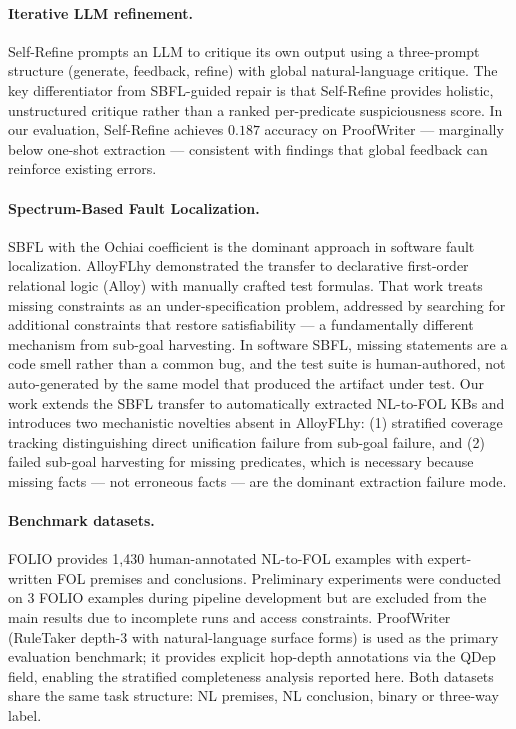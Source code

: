 \documentclass[11pt,letterpaper]{article}
\begin{document}
\paragraph{Iterative LLM refinement.} Self-Refine \citep{Madaan2023} prompts an LLM to critique its own output using a three-prompt structure (generate, feedback, refine) with global natural-language critique. The key differentiator from SBFL-guided repair is that Self-Refine provides holistic, unstructured critique rather than a ranked per-predicate suspiciousness score. In our evaluation, Self-Refine achieves $0.187$ accuracy on ProofWriter — marginally below one-shot extraction — consistent with findings that global feedback can reinforce existing errors.

\paragraph{Spectrum-Based Fault Localization.} SBFL with the Ochiai coefficient \citep{Abreu2007} is the dominant approach in software fault localization. AlloyFLhy \citep{Wang2020} demonstrated the transfer to declarative first-order relational logic (Alloy) with manually crafted test formulas. That work treats missing constraints as an under-specification problem, addressed by searching for additional constraints that restore satisfiability — a fundamentally different mechanism from sub-goal harvesting. In software SBFL, missing statements are a code smell rather than a common bug, and the test suite is human-authored, not auto-generated by the same model that produced the artifact under test. Our work extends the SBFL transfer to automatically extracted NL-to-FOL KBs and introduces two mechanistic novelties absent in AlloyFLhy: (1) stratified coverage tracking distinguishing direct unification failure from sub-goal failure, and (2) failed sub-goal harvesting for missing predicates, which is necessary because missing facts — not erroneous facts — are the dominant extraction failure mode.

\paragraph{Benchmark datasets.} FOLIO \citep{Han2022} provides 1,430 human-annotated NL-to-FOL examples with expert-written FOL premises and conclusions. Preliminary experiments were conducted on 3 FOLIO examples during pipeline development but are excluded from the main results due to incomplete runs and access constraints. ProofWriter \citep{Clark2020,Tafjord2021} (RuleTaker depth-3 with natural-language surface forms) is used as the primary evaluation benchmark; it provides explicit hop-depth annotations via the QDep field, enabling the stratified completeness analysis reported here. Both datasets share the same task structure: NL premises, NL conclusion, binary or three-way label.
\end{document}

